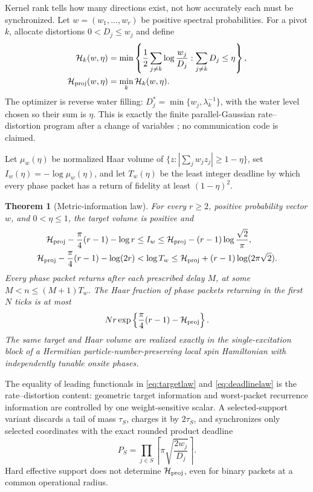 \documentclass[10pt]{article}
\newtheorem{theorem}{Theorem}
\theoremstyle{definition}
\newcommand{\Hwater}{\mathcal H}
\begin{document}
Kernel rank tells how many directions exist, not how accurately each must be
synchronized.  Let $w=(w_1,\ldots,w_r)$ be positive spectral probabilities.
For a pivot $k$, allocate distortions $0<D_j\le w_j$ and define
\begin{align}
 \Hwater_k(w,\eta)
 &=\min\left\{\frac12\sum_{j\ne k}\log\frac{w_j}{D_j}:
      \sum_{j\ne k}D_j\le\eta\right\},                 \label{eq:waterpivot}\\
 \Hwater_{\rm proj}(w,\eta)&=\min_k\Hwater_k(w,\eta). \label{eq:water}
\end{align}
The optimizer is reverse water filling:
$D_j^*=\min\{w_j,\lambda_k^{-1}\}$, with the water level chosen so their
sum is $\eta$.  This is exactly the finite parallel-Gaussian
rate--distortion program after a change of variables \cite{CoverThomas2006,
GrayNeuhoff1998}; no communication code is claimed.

Let $\mu_w(\eta)$ be normalized Haar volume of
$\{z:|\sum_jw_jz_j|\ge1-\eta\}$, set
$I_w(\eta)=-\log\mu_w(\eta)$, and let $T_w(\eta)$ be the least integer
deadline by which every phase packet has a return of fidelity at least
$(1-\eta)^2$.

\begin{theorem}[Metric-information law]
\label{thm:water}
For every $r\ge2$, positive probability vector $w$, and
$0<\eta\le1$, the target volume is positive and
\begin{align}
 \Hwater_{\rm proj}-\frac\pi4(r-1)-\log r
 &\le I_w
 \le\Hwater_{\rm proj}-(r-1)\log\frac{\sqrt2}{\pi},    \label{eq:targetlaw}\\
 \Hwater_{\rm proj}-\frac\pi4(r-1)-\log(2r)
 &<\log T_w
 \le\Hwater_{\rm proj}+(r-1)\log(2\pi\sqrt2).         \label{eq:deadlinelaw}
\end{align}
Every phase packet returns after each prescribed delay $M$, at some
$M<n\le(M+1)T_w$.  The Haar fraction of phase packets returning in the
first $N$ ticks is at most
\begin{equation}
 Nr\exp\left\{\frac\pi4(r-1)-\Hwater_{\rm proj}\right\}. \label{eq:hithaar}
\end{equation}
The same target and Haar volume are realized exactly in the
single-excitation block of a Hermitian particle-number-preserving local spin
Hamiltonian with independently tunable onsite phases.
\end{theorem}

The equality of leading functionals in \eqref{eq:targetlaw} and
\eqref{eq:deadlinelaw} is the rate--distortion content: geometric target
information and worst-packet recurrence information are controlled by one
weight-sensitive scalar.  A selected-support variant discards a tail of mass
$\tau_S$, charges it by $2\tau_S$, and synchronizes only selected
coordinates with the exact rounded product deadline
\begin{equation}
 P_S=\prod_{j\in S}\left\lceil
       \pi\sqrt{\frac{2w_j}{D_j}}\right\rceil.          \label{eq:selected}
\end{equation}
Hard effective support does not determine $\Hwater_{\rm proj}$, even for
binary packets at a common operational radius.
\end{document}
